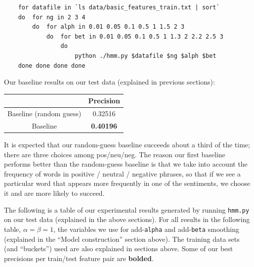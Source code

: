 \documentclass{article}
\begin{document}
\begin{verbatim}
    for datafile in `ls data/basic_features_train.txt | sort`
    do  for ng in 2 3 4
        do  for alph in 0.01 0.05 0.1 0.5 1 1.5 2 3
            do  for bet in 0.01 0.05 0.1 0.5 1 1.3 2 2.2 2.5 3
                do
                    python ./hmm.py $datafile $ng $alph $bet
    done done done done
\end{verbatim}

Our baseline results on our test data (explained in previous sections):\par\medskip
\begin{tabular}{|c|c|}\hline
                        & Precision\\\hline
Baseline (random guess) & 0.32516\\
Baseline                & \textbf{0.40196}\\\hline
\end{tabular}\par\medskip

It is expected that our random-guess baseline succeeds about a third of the time; there are three choices among pos/neu/neg. The reason our first baseline performs better than the random-guess baseline is that we take into account the frequency of words in positive / neutral / negative phrases, so that if we see a particular word that appears more frequently in one of the sentiments, we choose it and are more likely to succeed.\par\bigskip

The following is a table of our experimental results generated by running \texttt{hmm.py} on our test data (explained in the above sections). For all results in the following table, $\alpha = \beta = 1$, the variables we use for add-\texttt{alpha} and add-\texttt{beta} smoothing (explained in the ``Model construction'' section above). The training data sets (and ``buckets'') used are also explained in sections above. Some of our best precisions per train/test feature pair are \textbf{bolded}.\par\bigskip
\end{document}
